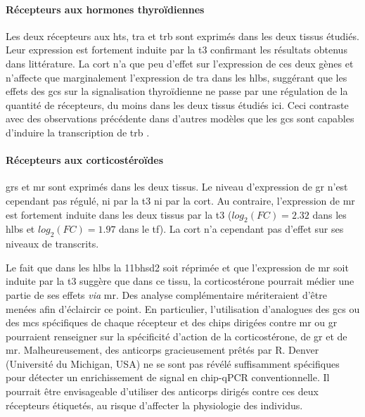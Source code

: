 \documentclass[../main.tex]{subfiles}
\begin{document}
			\paragraph{Récepteurs aux hormones thyroïdiennes}
				Les deux récepteurs aux \glspl{ht}, \gls{tra} et \gls{trb} sont exprimés dans les deux tissus étudiés.
				Leur expression est fortement induite par la \gls{t3} confirmant les résultats obtenus dans littérature.
				La \gls{cort} n'a que peu d'effet sur l'expression de ces deux gènes et n'affecte que marginalement l'expression de \gls{tra} dans les \glspl{hlb}, suggérant que les effets des \glspl{gc} sur la signalisation thyroïdienne ne passe par une régulation de la quantité de récepteurs, du moins dans les deux tissus étudiés ici.
				Ceci contraste avec des observations précédente dans d'autres modèles que les \glspl{gc} sont capables d'induire la transcription de \gls{trb} \citep{Montesinos2006}.

			\paragraph{Récepteurs aux corticostéroïdes}
				\glspl{gr} et \gls{mr} sont exprimés dans les deux tissus.
				Le niveau d'expression de \gls{gr} n'est cependant pas régulé, ni par la \gls{t3} ni par la \gls{cort}.
				Au contraire, l'expression de \gls{mr} est fortement induite dans les deux tissus par la \gls{t3} ($log_2(FC)=2.32$ dans les \glspl{hlb} et $log_2(FC)=1.97$ dans le \gls{tf}).
				La \gls{cort} n'a cependant pas d'effet sur ses niveaux de transcrits.
				\par
				Le fait que dans les \glspl{hlb} la \gls{11bhsd2} soit réprimée et que l'expression de \gls{mr} soit induite par la \gls{t3} suggère que dans ce tissu, la corticostérone pourrait médier une partie de ses effets \textit{via} \gls{mr}.
				Des analyse complémentaire mériteraient d'être menées afin d'éclaircir ce point.
				En particulier, l'utilisation d'analogues des \glspl{gc} ou des \glspl{mc} spécifiques de chaque récepteur et des \glspl{chip} dirigées contre \gls{mr} ou \gls{gr} pourraient renseigner sur la spécificité d'action de la corticostérone, de \gls{gr} et de \gls{mr}.
				Malheureusement, des anticorps gracieusement prêtés par R. Denver (Université du Michigan, USA) ne se sont pas révélé suffisamment spécifiques pour détecter un enrichissement de signal en \gls{chip}-qPCR conventionnelle.
				Il pourrait être envisageable d'utiliser des anticorps dirigés contre ces deux récepteurs étiquetés, au risque d'affecter la physiologie des individus.
\end{document}
